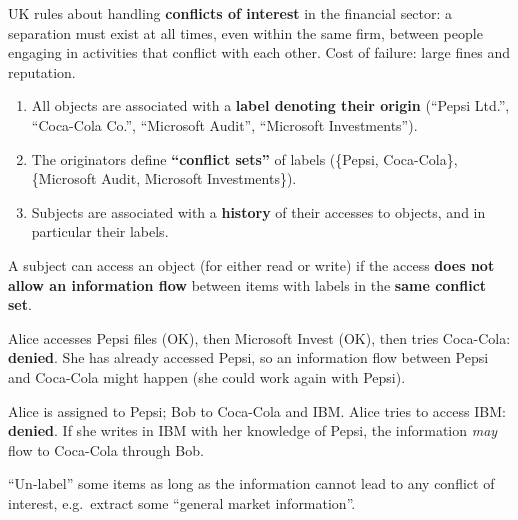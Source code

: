 \begin{rembox}[title=Inspiration]
UK rules about handling \textbf{conflicts of interest} in the financial sector: a
separation must exist at all times, even within the same firm, between people engaging
in activities that conflict with each other. Cost of failure: large fines and
reputation.
\end{rembox}

\begin{defnbox}[title=Chinese Wall model --- entities]
\begin{enumerate}
  \item All objects are associated with a \textbf{label denoting their origin}
        (``Pepsi Ltd.'', ``Coca-Cola Co.'', ``Microsoft Audit'', ``Microsoft
        Investments'').
  \item The originators define \textbf{``conflict sets''} of labels
        (\{Pepsi, Coca-Cola\}, \{Microsoft Audit, Microsoft Investments\}).
  \item Subjects are associated with a \textbf{history} of their accesses to objects,
        and in particular their labels.
\end{enumerate}
\end{defnbox}

\begin{defnbox}[title=Chinese Wall access rule]
A subject can access an object (for either read or write) if the access \textbf{does not
allow an information flow} between items with labels in the \textbf{same conflict set}.
\end{defnbox}

\begin{exbox}[title=Direct flow]
Alice accesses Pepsi files (OK), then Microsoft Invest (OK), then tries Coca-Cola:
\textbf{denied}. She has already accessed Pepsi, so an information flow between Pepsi and
Coca-Cola might happen (she could work again with Pepsi).
\end{exbox}

\begin{exbox}[title=Indirect flow]
Alice is assigned to Pepsi; Bob to Coca-Cola and IBM. Alice tries to access IBM:
\textbf{denied}. If she writes in IBM with her knowledge of Pepsi, the information
\emph{may} flow to Coca-Cola through Bob.
\end{exbox}

\begin{rembox}[title=Sanitization is necessary for business]
``Un-label'' some items as long as the information cannot lead to any conflict of
interest, e.g.\ extract some ``general market information''.
\end{rembox}

